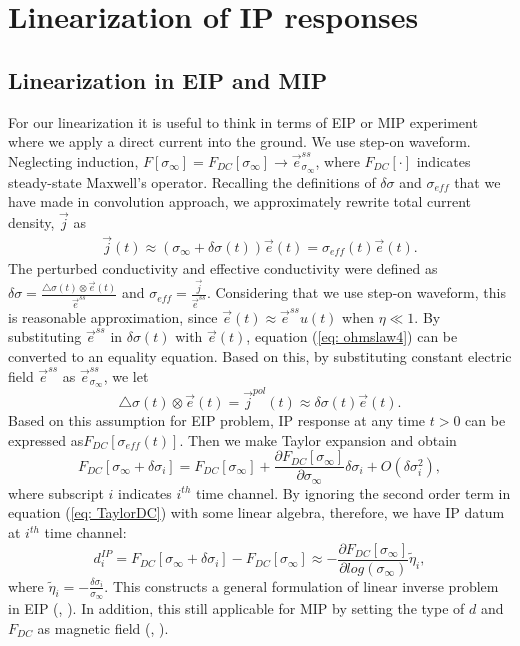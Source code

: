 \documentclass[a4paper, 11pt]{article}
\newcommand{\siginf}{\sigma_\infty}
\newcommand{\dsig}{\triangle\sigma}
\renewcommand {\j}  { {\vec j} }
\newcommand {\e}  { {\vec e} }
\newcommand{\peta}{\tilde{\eta}}
\newcommand{\dip}{d^{IP}}
\newcommand{\sigpert}{\delta\sigma}
\begin{document}
\section{Linearization of IP responses}
\subsection{Linearization in EIP and MIP}
For our linearization it is useful to think in terms of EIP or MIP experiment where we apply a direct current into the ground. We use step-on waveform. Neglecting induction, $F[\siginf]=F_{DC}[\siginf] \rightarrow \e^{ss}_{\siginf}$, where $F_{DC}[\cdot]$ indicates steady-state Maxwell's operator. Recalling the definitions of $\delta\sigma$ and $\sigma_{eff}$ that we have made in convolution approach, we approximately rewrite total current density, $\j$ as
\begin{eqnarray}
	\j(t) \approx (\siginf + \delta\sigma(t))\e(t) = \sigma_{eff}(t)\e(t).
  	\label{eq: ohmslaw4}
\end{eqnarray}
The perturbed conductivity and effective conductivity were defined as $\delta\sigma = \frac{\dsig(t)\otimes\e(t)}{\e^{ss}}$ and $\sigma_{eff} = \frac{\j}{\e^{ss}}$. Considering that we use step-on waveform, this is reasonable approximation, since $\e(t)\approx \e^{ss}u(t)$ when $\eta \ll 1$. By substituting $\vec{e}^{ss}$ in $\delta\sigma(t)$ with $\vec{e}(t)$, equation (\ref{eq: ohmslaw4}) can be converted to an equality equation. Based on this, by substituting constant electric field $\e^{ss}$ as $\e_{\siginf}^{ss}$, we let
\begin{equation}
  \dsig(t)\otimes\e(t) = \j^{pol}(t) \approx \delta\sigma(t)\e(t).
  \label{eq: jpol_approx}
\end{equation}
Based on this assumption for EIP problem, IP response at any time $t>0$ can be expressed as$F_{DC}[\sigma_{eff}(t)]$. Then we make Taylor expansion and obtain
\begin{equation}
  F_{DC}[\siginf + \delta\sigma_i] = F_{DC}[\siginf] + \frac{\partial F_{DC}[\siginf]}{\partial\siginf}\delta\sigma_i + O(\delta\sigma_i^2),
  \label{eq: TaylorDC}
\end{equation}
where subscript $i$ indicates $i^{th}$ time channel. By ignoring the second order term in equation (\ref{eq: TaylorDC}) with some linear algebra, therefore, we have IP datum at $i^{th}$ time channel:
\begin{equation}
  \dip_i = F_{DC}[\siginf + \delta\sigma_i] - F_{DC}[\siginf] \approx -\frac{\partial F_{DC}[\siginf]}{\partial log(\siginf)}\peta_i,
  \label{eq: EIPlinear1}
\end{equation}
where $\peta_i = -\frac{\sigpert_i}{\siginf}$. This constructs a general formulation of linear inverse problem in EIP (\cite{Yuval1997}, \cite{Hordt2006}). In addition, this still applicable for MIP by setting the type of $d$ and $F_{DC}$ as magnetic field (\cite{seigel1974}, \cite{Chen2003}).
\end{document}
